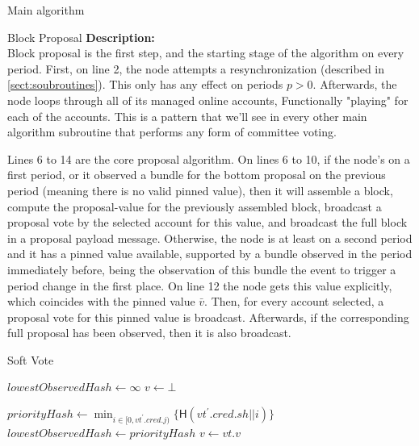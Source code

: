 \documentclass[10pt,a4paper]{article}
\begin{document}
\begin{section}{Main algorithm}
\begin{subsection}{Block Proposal}
\newpage
\noindent \textbf{Description:}\\
Block proposal is the first step, and the starting stage of the algorithm on every period.
First, on line 2, the node attempts a resynchronization (described in \ref{sect:soubroutines}). 
This only has any effect on periods $p > 0$.
Afterwards, the node loops through all of its managed online accounts, Functionally
"playing" for each of the accounts. This is a pattern that we'll see in every other
main algorithm subroutine that performs any form of committee voting.

Lines 6 to 14 are the core proposal algorithm. On lines 6 to 10, 
if the node's on a first period, or it observed a bundle for the bottom proposal on the previous 
period (meaning there is no valid pinned value), then it will assemble a block, compute the proposal-value for the 
previously assembled block, broadcast a proposal vote by the selected account for this value, and 
broadcast the full block in a proposal payload message.
Otherwise, the node is at least on a second period and it has a pinned value available, supported by a 
bundle observed in the period immediately before, being the observation of this bundle the event to trigger 
a period change in the first place. On line 12 the node gets this value explicitly, which coincides with the pinned
value $\bar{v}$. 
Then, for every account selected, a proposal vote for this pinned value is broadcast. Afterwards, 
if the corresponding full proposal has been observed, then it is also broadcast.


\end{subsection}
\begin{subsection}{Soft Vote}\label{ssect:softvote}

\begin{algorithm}[H]
    \caption{\underline{Soft Vote}}
    \label{algo:soft-vote}
    \begin{algorithmic}[1]
    \State $lowestObservedHash \gets \infty$
    \State $v \gets \bot$ 

        \State $priorityHash \gets \min_{i \in [0, vt^\prime.cred.j)} \{ \mathsf{H}(vt^\prime.cred.sh || i)\}$
            \State $lowestObservedHash \gets priorityHash$
            \State $v \gets vt.v$
        \EndIf    
    \EndFor


\end{algorithmic}
\end{algorithm}
\end{subsection}
\end{section}
\end{document}
